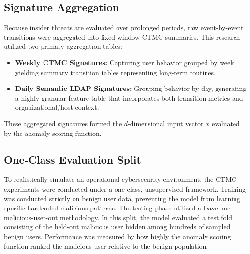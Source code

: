 \subsection{Signature Aggregation}
Because insider threats are evaluated over prolonged periods, raw event-by-event transitions were aggregated into fixed-window CTMC summaries. This research utilized two primary aggregation tables:
\begin{itemize}
    \item \textbf{Weekly CTMC Signatures:} Capturing user behavior grouped by week, yielding summary transition tables representing long-term routines.
    \item \textbf{Daily Semantic LDAP Signatures:} Grouping behavior by day, generating a highly granular feature table that incorporates both transition metrics and organizational/host context.
\end{itemize}
These aggregated signatures formed the $d$-dimensional input vector $x$ evaluated by the anomaly scoring function.

\subsection{One-Class Evaluation Split}
To realistically simulate an operational cybersecurity environment, the CTMC experiments were conducted under a one-class, unsupervised framework. Training was conducted strictly on benign user data, preventing the model from learning specific hardcoded malicious patterns. The testing phase utilized a leave-one-malicious-user-out methodology. In this split, the model evaluated a test fold consisting of the held-out malicious user hidden among hundreds of sampled benign users. Performance was measured by how highly the anomaly scoring function ranked the malicious user relative to the benign population.


